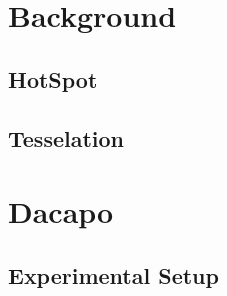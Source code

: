 \documentclass{sig-alternate}
\begin{document}
\section{Background}

\subsection{HotSpot}


\subsection{Tesselation}


%

\section{Dacapo}


\subsection{Experimental Setup}
\end{document}

